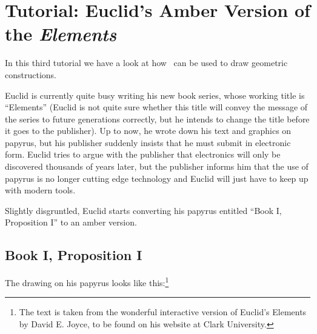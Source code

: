 %
%
%


\section[tutorial-Euclid]{Tutorial: Euclid's Amber Version of the \emph{Elements}}

In this third tutorial we have a look at how \tikzname\ can be used to draw
geometric constructions.

Euclid is currently quite busy writing his new book series, whose working title
is ``Elements'' (Euclid is not quite sure whether this title will convey the
message of the series to future generations correctly, but he intends to change
the title before it goes to the publisher). Up to now, he wrote down his text
and graphics on papyrus, but his publisher suddenly insists that he must submit
in electronic form. Euclid tries to argue with the publisher that electronics
will only be discovered thousands of years later, but the publisher informs him
that the use of papyrus is no longer cutting edge technology and Euclid will
just have to keep up with modern tools.

Slightly disgruntled, Euclid starts converting his papyrus entitled ``Book I,
Proposition I'' to an amber version.


\subsection{Book I, Proposition I}

The drawing on his papyrus looks like this:\footnote{The text is taken from the
wonderful interactive version of Euclid's Elements by David E. Joyce, to be
found on his website at Clark University.}

